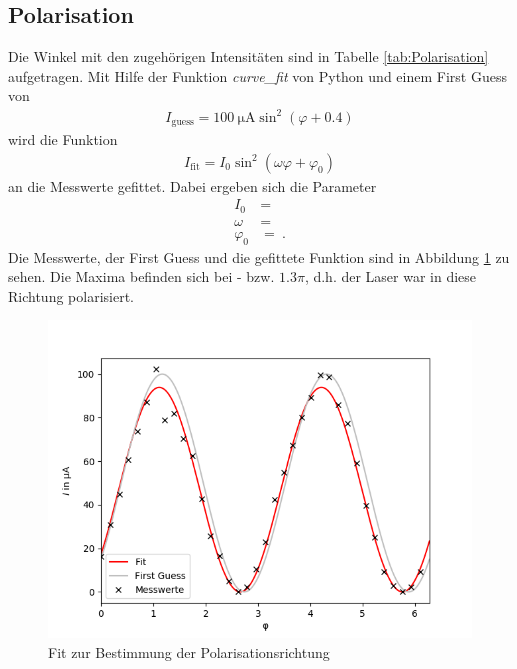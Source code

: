 \subsection{Polarisation}
Die Winkel mit den zugehörigen Intensitäten sind in Tabelle \ref{tab:Polarisation} aufgetragen. Mit Hilfe der Funktion \textit{curve\_fit} von Python und einem First Guess von
\begin{align*}
	I_\text{guess} = \SI{100}{\micro\ampere}\sin^2(\varphi + 0.4)
\end{align*}
wird die Funktion
\begin{align*}
	I_\text{fit} = I_0\sin^2\left(\omega\varphi + \varphi_0\right)
\end{align*}
an die Messwerte gefittet. Dabei ergeben sich die Parameter
\begin{align}
	I_0 &=  \\
	\omega &=  \\
	\varphi_0 &=  \ .
\end{align}
Die Messwerte, der First Guess und die gefittete Funktion sind in Abbildung \ref{fig:fitPol} zu sehen. Die Maxima befinden sich bei - bzw. $1.3\pi$, d.h. der Laser war in diese Richtung polarisiert.
\begin{figure}[h!]
	\centering
	\includegraphics[width=.6\textwidth]{Fit_Polarisation.png}
	\caption{Fit zur Bestimmung der Polarisationsrichtung}
	\label{fig:fitPol}
\end{figure}

